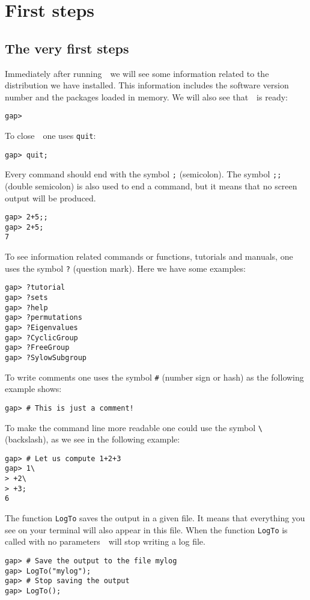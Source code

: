 \chapter{First steps}
\label{first} 

\section{The very first steps}
\label{section:primeros_pasos}

Immediately after running~\GAP~we will see some information related to the
distribution we have installed.  This information includes the software version
number and the packages loaded in memory. 
We will also see that~\GAP~is ready:
\begin{lstlisting}
gap>
\end{lstlisting}

To close~\GAP~one uses \lstinline{quit}:
\begin{lstlisting}
gap> quit;
\end{lstlisting}

Every command should end with the symbol \lstinline{;} (semicolon). The symbol
\lstinline{;;} (double semicolon) is also used to end a command, but it means
that no screen output will be produced. 

\begin{lstlisting}
gap> 2+5;;
gap> 2+5;
7
\end{lstlisting}

To see information related commands or functions, tutorials and manuals, one
uses the symbol \lstinline{?} (question mark). Here we have some examples:
\begin{lstlisting}
gap> ?tutorial
gap> ?sets
gap> ?help
gap> ?permutations
gap> ?Eigenvalues
gap> ?CyclicGroup
gap> ?FreeGroup
gap> ?SylowSubgroup
\end{lstlisting}

To write comments one uses the symbol \lstinline{#} (number sign or hash) as
the following example shows:
\begin{lstlisting}
gap> # This is just a comment!
\end{lstlisting}

To make the command line more readable one could use the
symbol \verb+\+ (backslash), as we see in the following example:
\begin{lstlisting}
gap> # Let us compute 1+2+3
gap> 1\
> +2\
> +3;
6
\end{lstlisting}

The function \lstinline{LogTo} saves the output
in a given file. It means that everything you see on your terminal will also appear in
this file. 
When the function \lstinline{LogTo} is
called with no parameters~\GAP~will stop writing a log file.
\begin{lstlisting}
gap> # Save the output to the file mylog
gap> LogTo("mylog");
gap> # Stop saving the output
gap> LogTo();
\end{lstlisting}

